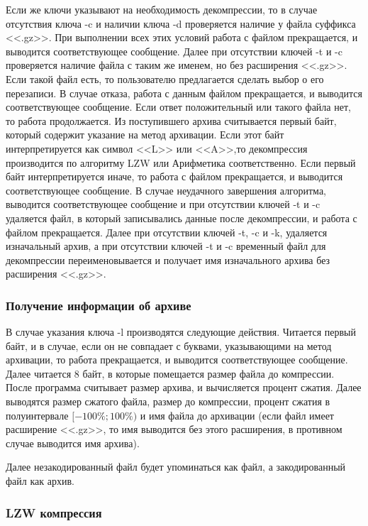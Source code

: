\documentclass[12pt]{article}
\begin{document}
Если же ключи указывают на необходимость декомпрессии, то в случае отсутствия ключа -c и наличии ключа -d проверяется наличие у файла суффикса <<.gz>>. При выполнении всех этих условий работа с файлом прекращается, и выводится соответствующее сообщение. Далее при отсутствии ключей -t и -c проверяется наличие файла с таким же именем, но без расширения <<.gz>>. Если такой файл есть, то пользователю предлагается сделать выбор о его перезаписи. В случае отказа, работа с данным файлом прекращается, и выводится соответствующее сообщение. Если ответ положительный или такого файла нет, то работа продолжается. Из поступившего архива считывается первый байт, который содержит указание на метод архивации. Если этот байт интерпретируется как символ <<L>> или <<A>>,то декомпрессия производится по алгоритму LZW или Арифметика соответственно. Если первый байт интерпретируется иначе, то работа с файлом прекращается, и выводится соответствующее сообщение. В случае неудачного завершения алгоритма, выводится соответствующее сообщение и при отсутствии ключей -t и -c удаляется файл, в который записывались данные после декомпрессии, и работа с файлом прекращается. Далее при отсутствии ключей -t, -c и -k, удаляется изначальный архив, а при отсутствии ключей -t и -c временный файл для декомпрессии переименовывается и получает имя изначального архива без расширения <<.gz>>.

\subsubsection*{Получение информации об архиве}

В случае указания ключа -l производятся следующие действия. Читается первый байт, и в случае, если он не совпадает с буквами, указывающими на метод архивации, то работа прекращается, и выводится соответствующее сообщение. Далее читается 8 байт, в которые помещается размер файла до компрессии. После программа считывает размер архива, и вычисляется процент сжатия. Далее выводятся размер сжатого файла, размер до компрессии, процент сжатия в полуинтервале $[-100\%; 100\%)$ и имя файла до архивации (если файл имеет расширение <<.gz>>, то имя выводится без этого расширения, в противном случае выводится имя архива).

Далее незакодированный файл будет упоминаться как файл, а закодированный файл как архив.%

\subsubsection*{LZW компрессия}
\end{document}
